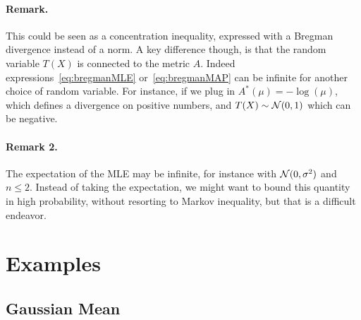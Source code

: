 \documentclass[twoside]{article}
\newcommand{\logpart}{A}
\newcommand{\conj}{\logpart^*}
\begin{document}
\paragraph{Remark.}
This could be seen as a concentration inequality, expressed with a Bregman divergence instead of a norm.
A key difference though, is that the random variable $T(X)$ is connected to the metric $\logpart$. 
Indeed expressions~\eqref{eq:bregmanMLE} or~\eqref{eq:bregmanMAP} can be infinite for another choice of random variable. 
For instance, if we plug in $\conj(\mu)= -\log(\mu)$, which defines a divergence on positive numbers, and $T(X) \sim {\mathcal N}(0,1)$ which can be negative.

\paragraph{Remark 2.}
The expectation of the MLE may be infinite, for instance with ${\mathcal N}(0,\sigma^2)$ and $n\leq 2$. Instead of taking the expectation,  we might want to bound this quantity in high probability, without resorting to Markov inequality, but that is a difficult endeavor.

\section{Examples}
\subsection{Gaussian Mean}
\end{document}
